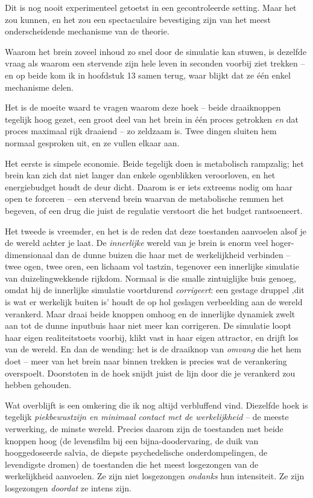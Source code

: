\documentclass[11pt, twoside, openright]{book}
\begin{document}
Dit is nog nooit experimenteel getoetst in een gecontroleerde setting. Maar het zou kunnen, en het zou een spectaculaire bevestiging zijn van het meest onderscheidende mechanisme van de theorie.

Waarom het brein zoveel inhoud zo snel door de simulatie kan stuwen, is dezelfde vraag als waarom een stervende zijn hele leven in seconden voorbij ziet trekken -- en op beide kom ik in hoofdstuk 13 samen terug, waar blijkt dat ze één enkel mechanisme delen.

Het is de moeite waard te vragen waarom deze hoek -- beide draaiknoppen tegelijk hoog gezet, een groot deel van het brein in één proces getrokken \textit{en} dat proces maximaal rijk draaiend -- zo zeldzaam is. Twee dingen sluiten hem normaal gesproken uit, en ze vullen elkaar aan.

Het eerste is simpele economie. Beide tegelijk doen is metabolisch rampzalig; het brein kan zich dat niet langer dan enkele ogenblikken veroorloven, en het energiebudget houdt de deur dicht. Daarom is er iets extreems nodig om haar open te forceren -- een stervend brein waarvan de metabolische remmen het begeven, of een drug die juist de regulatie verstoort die het budget rantsoeneert.

Het tweede is vreemder, en het is de reden dat deze toestanden aanvoelen alsof je de wereld achter je laat. De \textit{innerlijke} wereld van je brein is enorm veel hoger-dimensionaal dan de dunne buizen die haar met de werkelijkheid verbinden -- twee ogen, twee oren, een lichaam vol tastzin, tegenover een innerlijke simulatie van duizelingwekkende rijkdom. Normaal is die smalle zintuiglijke buis genoeg, omdat hij de innerlijke simulatie voortdurend \textit{corrigeert}: een gestage druppel ‚dit is wat er werkelijk buiten is' houdt de op hol geslagen verbeelding aan de wereld verankerd. Maar draai beide knoppen omhoog en de innerlijke dynamiek zwelt aan tot de dunne inputbuis haar niet meer kan corrigeren. De simulatie loopt haar eigen realiteitstoets voorbij, klikt vast in haar eigen attractor, en drijft los van de wereld. En dan de wending: het is de draaiknop van \textit{omvang} die het hem doet -- meer van het brein naar binnen trekken is precies wat de verankering overspoelt. Doorstoten in de hoek snijdt juist de lijn door die je verankerd zou hebben gehouden.

Wat overblijft is een omkering die ik nog altijd verbluffend vind. Diezelfde hoek is tegelijk \textit{piekbewustzijn en minimaal contact met de werkelijkheid} -- de meeste verwerking, de minste wereld. Precies daarom zijn de toestanden met beide knoppen hoog (de levensfilm bij een bijna-doodervaring, de duik van hooggedoseerde salvia, de diepste psychedelische onderdompelingen, de levendigste dromen) de toestanden die het meest losgezongen van de werkelijkheid aanvoelen. Ze zijn niet losgezongen \textit{ondanks} hun intensiteit. Ze zijn losgezongen \textit{doordat} ze intens zijn.
\end{document}
